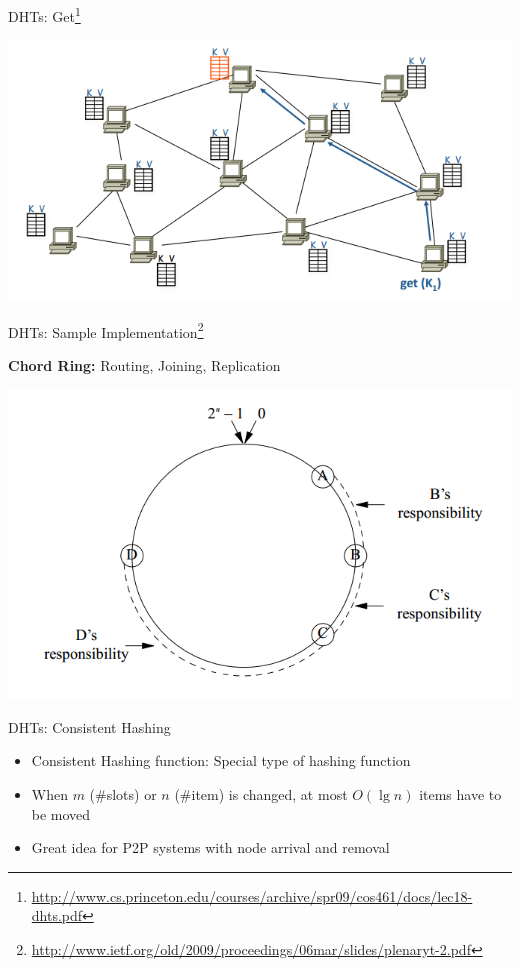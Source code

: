 \documentclass{beamer}
\begin{document}
\begin{frame}{DHTs: Get\footnote{\url{http://www.cs.princeton.edu/courses/archive/spr09/cos461/docs/lec18-dhts.pdf}}}

    \begin{center}
        \includegraphics[scale=0.4]{dhtGet.png}
    \end{center}
\end{frame}


\begin{frame}{DHTs: Sample Implementation\footnote{\url{http://www.ietf.org/old/2009/proceedings/06mar/slides/plenaryt-2.pdf}}}

    {\bf Chord Ring:} Routing, Joining, Replication
    \begin{center}
        \includegraphics[scale=0.4]{chordRing.png}
    \end{center}
\end{frame}

\begin{frame}{DHTs: Consistent Hashing}
    \begin{itemize}
        \item Consistent Hashing function: Special type of hashing function
        \item When $m$ (\#slots) or $n$ (\#item) is changed,  at most $O(\lg n)$ items have to be moved
        \item Great idea for P2P systems with node arrival and removal
    \end{itemize}
\end{frame}
\end{document}
